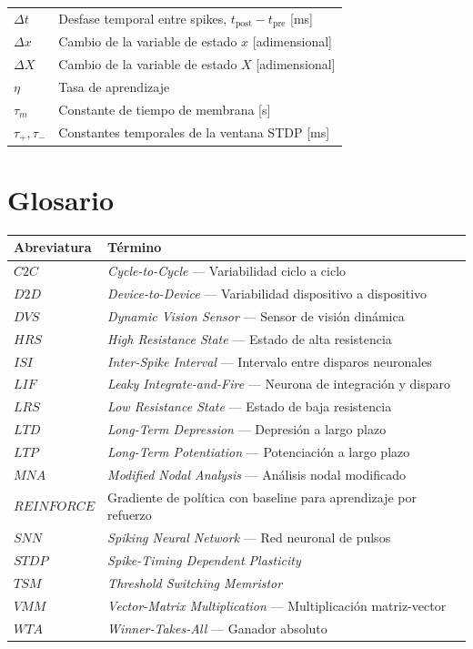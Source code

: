 \begin{longtable}[l]{>{}l<{}l}
$\Delta t$ & Desfase temporal entre spikes, $t_{\mathrm{post}}-t_{\mathrm{pre}}$ [ms] \\
$\Delta x$ & Cambio de la variable de estado $x$ [adimensional] \\
$\Delta X$ & Cambio de la variable de estado $X$ [adimensional] \\
$\eta$     & Tasa de aprendizaje \\
$\tau_m$   & Constante de tiempo de membrana [s] \\
$\tau_+, \tau_-$ & Constantes temporales de la ventana STDP [ms] \\
\end{longtable}

\vspace{5ex}

\section*{Glosario}

\begin{longtable}[l]{>{}l<{}l}
\textbf{Abreviatura} & \textbf{Término} \\[0.5ex] \hline
$C2C$   & \textit{Cycle-to-Cycle} --- Variabilidad ciclo a ciclo \\
$D2D$   & \textit{Device-to-Device} --- Variabilidad dispositivo a dispositivo \\
$DVS$   & \textit{Dynamic Vision Sensor} --- Sensor de visión dinámica \\
$HRS$   & \textit{High Resistance State} --- Estado de alta resistencia \\
$ISI$   & \textit{Inter-Spike Interval} --- Intervalo entre disparos neuronales \\
$LIF$   & \textit{Leaky Integrate-and-Fire} --- Neurona de integración y disparo \\
$LRS$   & \textit{Low Resistance State} --- Estado de baja resistencia \\
$LTD$   & \textit{Long-Term Depression} --- Depresión a largo plazo \\
$LTP$   & \textit{Long-Term Potentiation} --- Potenciación a largo plazo \\
$MNA$   & \textit{Modified Nodal Analysis} --- Análisis nodal modificado \\
$REINFORCE$ & Gradiente de política con baseline para aprendizaje por refuerzo \\
$SNN$   & \textit{Spiking Neural Network} --- Red neuronal de pulsos \\
$STDP$  & \textit{Spike-Timing Dependent Plasticity} \\
$TSM$   & \textit{Threshold Switching Memristor} \\
$VMM$   & \textit{Vector-Matrix Multiplication} --- Multiplicación matriz-vector \\
$WTA$   & \textit{Winner-Takes-All} --- Ganador absoluto \\
\end{longtable}

\setlength{\extrarowheight}{0pt}
